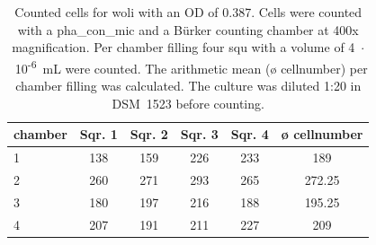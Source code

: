 \begin{table}[ht]
\centering
\caption[Counted cells for \acrlong{woli} with an \acrshort{OD} of 0.387.]{Counted cells for \acrlong{woli} with an \acrshort{OD} of 0.387. Cells were counted with a \gls{pha_con_mic} and a Bürker counting chamber at 400x magnification. Per chamber filling four \acrfull{squ} with a volume of 4~$\cdot$~10\textsuperscript{-6}~mL were counted. The arithmetic mean (ø cellnumber) per chamber filling was calculated. The culture was diluted 1:20 in DSM~1523 before counting.} 
\label{tab:cellnmr_wol_Bürk_1}
\begin{tabular}{lccccc}
  \toprule
chamber & Sqr. 1 & Sqr. 2 & Sqr. 3 & Sqr. 4 & ø cellnumber \\ 
  \midrule
1 & 138 & 159 & 226 & 233 & 189 \\ 
  2 & 260 & 271 & 293 & 265 & 272.25 \\ 
  3 & 180 & 197 & 216 & 188 & 195.25 \\ 
  4 & 207 & 191 & 211 & 227 & 209 \\ 
   \bottomrule
\end{tabular}
\end{table}
